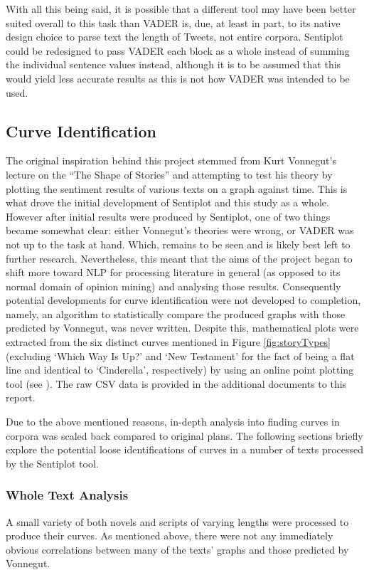 \documentclass{article}
\begin{document}
{        With all this being said, it is possible that a different tool may have been better suited overall to this task than VADER is, due, at least in part, to its native design choice to parse text the length of Tweets, not entire corpora. Sentiplot could be redesigned to pass VADER each block as a whole instead of summing the individual sentence values instead, although it is to be assumed that this would yield less accurate results as this is not how VADER was intended to be used.
    \subsection{Curve Identification}
    \label{subsec:curves}
        The original inspiration behind this project stemmed from Kurt Vonnegut's lecture on the ``The Shape of Stories'' and attempting to test his theory by plotting the sentiment results of various texts on a graph against time. This is what drove the initial development of Sentiplot and this study as a whole. However after initial results were produced by Sentiplot, one of two things became somewhat clear: either Vonnegut's theories were wrong, or VADER was not up to the task at hand. Which, remains to be seen and is likely best left to further research. Nevertheless, this meant that the aims of the project began to shift more toward NLP for processing literature in general (as opposed to its normal domain of opinion mining) and analysing those results. Consequently potential developments for curve identification were not developed to completion, namely, an algorithm to statistically compare the produced graphs with those predicted by Vonnegut, was never written. Despite this, mathematical plots were extracted from the six distinct curves mentioned in Figure \ref{fig:storyTypes} (excluding `Which Way Is Up?' and `New Testament' for the fact of being a flat line and identical to `Cinderella', respectively) by using an online point plotting tool (see \cite{webPlotDigitizer}). The raw CSV data is provided in the additional documents to this report.

        Due to the above mentioned reasons, in-depth analysis into finding curves in corpora was scaled back compared to original plans. The following sections briefly explore the potential loose identifications of curves in a number of texts processed by the Sentiplot tool.
        \subsubsection{Whole Text Analysis}
            A small variety of both novels and scripts of varying lengths were processed to produce their curves. As mentioned above, there were not any immediately obvious correlations between many of the texts' graphs and those predicted by Vonnegut.
            
}
\end{document}
